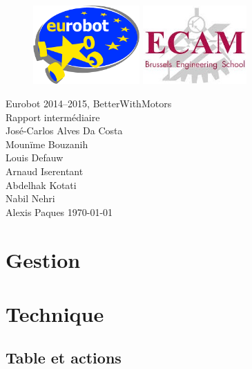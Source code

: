 \documentclass[a4paper ,11pt]{report}
\begin{document}
\begin{titlepage}
\begin{center}
\begin{figure}
    \includegraphics[height=3cm]{Eurobot.png}
   	\hfill
    \includegraphics[height=3cm]{ecam.jpg}
\end{figure}
\end{center}
\vspace{4cm}
\begin{center}
	{\Huge Eurobot 2014--2015, BetterWithMotors\\}
	{\huge Rapport intermédiaire\\}
	\vspace{1.5cm}
	José-Carlos Alves Da Costa\\
	Mounïme Bouzanih\\
	Louis Defauw\\
	Arnaud Iserentant\\
	Abdelhak Kotati\\
	Nabil Nehri\\
	Alexis Paques
	\vfill
	\today
\end{center}
\end{titlepage}

\tableofcontents

\chapter{Gestion}


\chapter{Technique}
\section{Table et actions}

\end{document}
